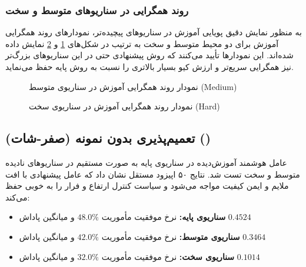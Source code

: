 \documentclass[oneside,openany,a4paper,12pt,draft]{article}
\begin{document}
\clearpage
\subsubsection{روند همگرایی در سناریوهای متوسط و سخت}
به منظور نمایش دقیق پویایی آموزش در سناریوهای پیچیده‌تر، نمودارهای روند همگرایی آموزش برای دو محیط متوسط و سخت به ترتیب در شکل‌های \ref{fig:dartsim_convergence_medium} و \ref{fig:dartsim_convergence_hard} نمایش داده شده‌اند. این نمودارها تأیید می‌کنند که روش پیشنهادی  حتی در این سناریوهای بزرگ‌تر نیز همگرایی سریع‌تر و ارزش کیو بسیار بالاتری را نسبت به روش پایه حفظ می‌نماید.

\begin{figure}[H]
  \centering
  \caption{نمودار روند همگرایی آموزش در سناریوی متوسط (Medium)}
  \label{fig:dartsim_convergence_medium}
\end{figure}

\begin{figure}[H]
  \centering
  \caption{نمودار روند همگرایی آموزش در سناریوی سخت (Hard)}
  \label{fig:dartsim_convergence_hard}
\end{figure}

\clearpage

\subsection{تعمیم‌پذیری بدون نمونه (صفر-شات) ()}
عامل هوشمند آموزش‌دیده در سناریوی پایه به صورت مستقیم در سناریوهای نادیده متوسط و سخت تست شد. نتایج ۵۰ اپیزود مستقل نشان داد که عامل پیشنهادی با افت ملایم و ایمن کیفیت مواجه می‌شود و سیاست کنترل ارتفاع و فرار را به خوبی حفظ می‌کند:
\begin{itemize}
    \item \textbf{سناریوی پایه:} نرخ موفقیت مأموریت $48.0\%$ و میانگین پاداش $0.4524$
    \item \textbf{سناریوی متوسط:} نرخ موفقیت مأموریت $42.0\%$ و میانگین پاداش $0.3464$
    \item \textbf{سناریوی سخت:} نرخ موفقیت مأموریت $32.0\%$ و میانگین پاداش $0.1014$ 
\end{itemize}
\end{document}
